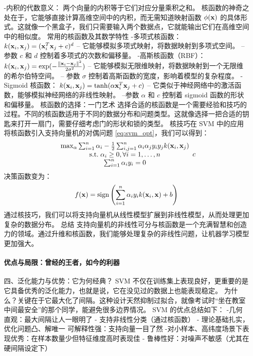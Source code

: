 -内积的代数意义： 两个向量的内积等于它们对应分量乘积之和。
核函数的神奇之处在于，它能够直接计算高维空间中的内积，而无需知道映射函数 $\phi({\bf x})$ 的具体形式。这就像一个黑盒子，我们只需要输入两个数据点，它就能输出它们在高维空间中的相似度。
 常用的核函数及其数学特性
-多项式核函数： $k({\bf x}_i, {\bf x}_j) = ({\bf x}_i^T {\bf x}_j + c)^d$
    -- 它能够模拟多项式映射，将数据映射到多项式空间。
    --参数 $c$ 和 $d$ 控制着多项式的次数和偏移量。
-高斯核函数（RBF）： $k({\bf x}_i, {\bf x}_j) = \exp(-\frac{\|{\bf x}_i - {\bf x}_j\|^2}{2\sigma^2})$
   -- 它能够模拟无限维映射，将数据映射到一个无限维的希尔伯特空间。
    -- 参数 $\sigma$ 控制着高斯函数的宽度，影响着模型的复杂程度。
-Sigmoid 核函数： $k({\bf x}_i, {\bf x}_j) = \tanh(\alpha {\bf x}_i^T {\bf x}_j + c)$
    -- 它类似于神经网络中的激活函数，能够模拟神经网络的非线性映射。
    --参数 $\alpha$ 和 $c$ 控制着 sigmoid 函数的形状和偏移量。
 核函数的选择：一门艺术
选择合适的核函数是一个需要经验和技巧的过程。不同的核函数适用于不同的数据分布和问题类型。这就像选择一把合适的钥匙来打开一扇门，需要仔细考虑门的形状和锁的类型。
 核技巧在 SVM 中的应用
将核函数引入支持向量机的对偶问题 \eqref{eq:svm_opt}，我们可以得到：
\begin{equation}\label{eq:svm_kernel_opt}
\begin{array}{c}
{\rm max}_{\alpha} \sum_{i=1}^n \alpha_i -\frac{1}{2} \sum_{i,j=1}^n \alpha_i \alpha_j y_i y_j k({\bf x}_i, {\bf x}_j) \\
{\rm s.t.} \; \alpha_i \ge 0, \forall i=1, \dots, n \\
\; \sum_{i=1}^n \alpha_i y_i =0
\; \end{array}{c}
\end{equation}
决策函数变为：
\begin{equation}\label{eq:svm_kernel_decision}
f({\bf x}) = {\rm sign}\left(\sum_{i=1}^n \alpha_i y_i k({\bf x}_i, {\bf x}) + b\right)
\end{equation}
通过核技巧，我们可以将支持向量机从线性模型扩展到非线性模型，从而处理更加复杂的数据分布。
 总结
支持向量机的非线性可分与核函数是一个充满智慧和创造力的领域。通过升维和核函数，我们能够处理复杂的非线性问题，让机器学习模型更加强大。
\paragraph*{优点与局限：曾经的王者，如今的利器}
{四、泛化能力与优势：它为何经典？}
SVM 不仅在训练集上表现良好，更重要的是它具备优秀的泛化能力，也就是说，它在没见过的数据上也能表现稳定。
为什么？关键在于它最大化了间隔。这种设计天然抑制过拟合，就像考试时“坐在教室中间最安全”的那个同学，能避免很多边界情况。
SVM 的优点总结如下：
-几何直观：最大间隔让人一眼明了
- 支持非线性分类（通过核函数）
- 理论基础扎实，优化问题凸、解唯一
可解释性强：支持向量一目了然
-对小样本、高纬度场景下表现优秀：在样本数量少但特征维度高时表现佳
- 鲁棒性好：对噪声不敏感（尤其在硬间隔设定下）
